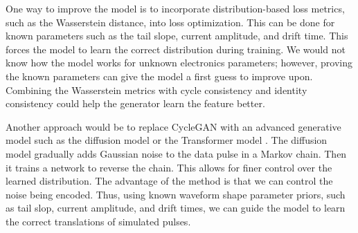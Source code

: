 One way to improve the model is to incorporate distribution-based loss metrics, such as the Wasserstein distance, into loss optimization. This can be done for known parameters such as the tail slope, current amplitude, and drift time. This forces the model to learn the correct distribution during training. We would not know how the model works for unknown electronics parameters; however, proving the known parameters can give the model a first guess to improve upon. Combining the Wasserstein metrics with cycle consistency and identity consistency could help the generator learn the feature better.

Another approach would be to replace CycleGAN with an advanced generative model such as the diffusion model \cite{2020arXiv200611239H} or the Transformer model \cite{Transformer}. The diffusion model gradually adds Gaussian noise to the data pulse in a Markov chain. Then it trains a network to reverse the chain. This allows for finer control over the learned distribution. The advantage of the method is that we can control the noise being encoded. Thus, using known waveform shape parameter priors, such as tail slop, current amplitude, and drift times, we can guide the model to learn the correct translations of simulated pulses.

\label{chap:conclusion}